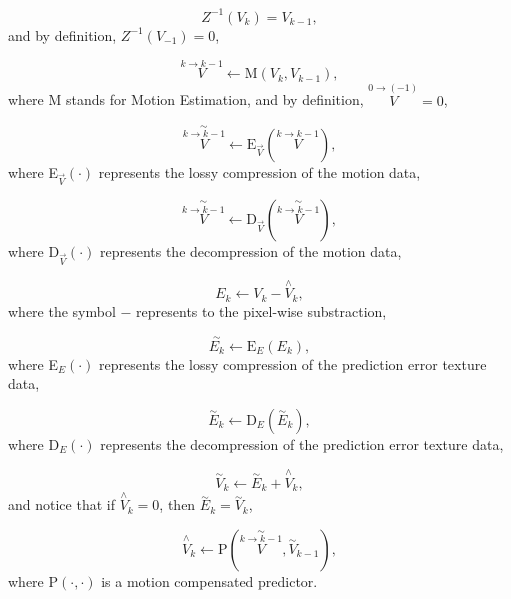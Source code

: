 \begin{equation}
  Z^{-1}(V_k) = V_{k-1},
  \tag{b}
\end{equation}
and by definition, $Z^{-1}(V_{-1}) = 0$,

\begin{equation}
  \overset{k\rightarrow k-1}{V} \leftarrow \text{M}(V_k, V_{k-1}),
  \tag{c}
\end{equation}
where M stands for Motion Estimation, and by definition,
$\overset{0\rightarrow (-1)}{V}=0$,

\begin{equation}
  \overset{\sim}{\overset{k\rightarrow k-1}{V}} \leftarrow \text{E}_{\overset{\rightarrow}{V}}(\overset{k\rightarrow k-1}{V}),
  \tag{d}
\end{equation}
where E$_{\overset{\rightarrow}{V}}(\cdot)$ represents the lossy
  compression of the motion data,

\begin{equation}
  \overset{\sim}{\overset{k\rightarrow k-1}{V}} \leftarrow \text{D}_{\overset{\rightarrow}{V}}(\overset{\sim}{\overset{k\rightarrow k-1}{V}}),
  \tag{e}
\end{equation}
where D$_{\overset{\rightarrow}{V}}(\cdot)$ represents the 
decompression of the motion data,

\begin{equation}
  E_k \leftarrow V_k - \overset{\wedge}{{V}}_k,
  \tag{f}
\end{equation}
where the symbol $-$ represents to the pixel-wise substraction,

\begin{equation}
  \overset{\sim}{E_k} \leftarrow \text{E}_{E}(E_k),
  \tag{g}
\end{equation}
where E$_{E}(\cdot)$ represents the lossy compression of the
prediction error texture data,

\begin{equation}
  \overset{\sim}{E}_k \leftarrow \text{D}_{E}(\overset{\sim}{E}_k),
  \tag{h}
\end{equation}
where D$_{E}(\cdot)$ represents the decompression of the prediction
error texture data,

\begin{equation}
  \overset{\sim}{V}_k \leftarrow \overset{\sim}{E}_k + \overset{\wedge}{V}_k,
  \tag{i}
\end{equation}
and notice that if $\overset{\wedge}{V}_k=0$, then
$\overset{\sim}{E}_k = \overset{\sim}{V}_k$,

\begin{equation}
  \overset{\wedge}{V}_k \leftarrow \text{P}(\overset{\sim}{\overset{k\rightarrow k-1}{V}}, \overset{\sim}{V}_{k-1}),
  \tag{j}
\end{equation}
where P$(\cdot,\cdot)$ is a motion compensated predictor.

